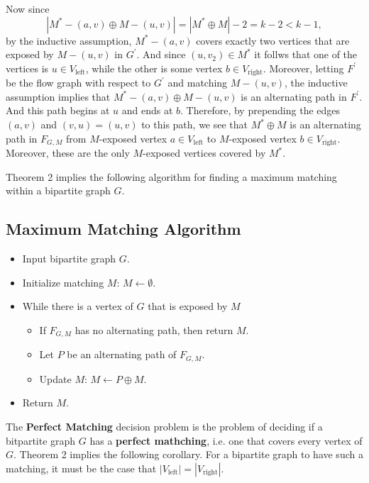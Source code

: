\documentclass [12pt]{article}
\theoremstyle{definition}
\begin{document}
 Now since  \[|M^{*}-(a,v)\oplus M-(u,v)|=|M^{*}\oplus M|-2=k-2 < k-1,\]
 by the inductive assumption, $M^{*}-(a,v)$ covers exactly two vertices that are exposed by $M-(u,v)$ in $G^{\prime}$. And since $(u,v_2)\in M^{*}$ it follws that one of the vertices is $u\in V_{\mbox{left}}$, while
 the other is some vertex $b\in V_{\mbox{right}}$. Moreover, letting $F^{\prime}$ be the flow graph with respect to $G^{\prime}$ and matching $M-(u,v)$, the inductive assumption implies that 
  $M^{*}-(a,v)\oplus M-(u,v)$ is an alternating path in  $F^{\prime}$. And this path begins at $u$ and ends at $b$. Therefore, by prepending the edges $(a,v)$ and $(v,u)=(u,v)$ to this path, we see that
 $M^{*}\oplus M$ is an alternating path in $F_{G,M}$ from $M$-exposed vertex $a\in  V_{\mbox{left}}$ to  $M$-exposed vertex $b\in V_{\mbox{right}}$. 
 Moreover, these are the only $M$-exposed vertices covered by $M^{*}$.
 
Theorem 2 implies the following algorithm for finding a maximum matching within a bipartite graph $G$.

\subsection*{Maximum Matching Algorithm}
\begin{itemize}
 \renewcommand{\labelitemi}{}
 \renewcommand{\labelitemii}{}
 \renewcommand{\labelitemiii}{}
\item Input bipartite graph $G$.
\item Initialize matching $M$: $M\leftarrow\emptyset$.
\item While there is a vertex of $G$ that is exposed by $M$
\begin{itemize}
\item If $F_{G,M}$ has no alternating path, then return $M$.
\item Let $P$ be an alternating path of  $F_{G,M}$.
\item Update $M$: $M\leftarrow P\oplus M$.
\end{itemize}
\item Return $M$.
\end{itemize}

The \textbf{Perfect Matching} decision problem is the problem of deciding if a bitpartite graph $G$ has a \textbf{perfect mathching}, i.e. one that covers every vertex of $G$. 
Theorem 2 implies the following corollary. For a bipartite graph to have such a matching, it must be the case that $|V_{\mbox{left}}|=|V_{\mbox{right}}|$.
\end{document}
